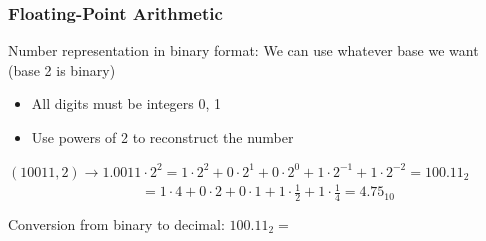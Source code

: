 \documentclass{beamer}
\begin{document}
\begin{frame}	
	\frametitle{Floating-Point Arithmetic}
	
	\begin{block}{Number representation in binary format:}
		We can use whatever base we want (base 2 is binary)
		
		\vspace{10pt}
		
		\begin{itemize}
			\item All digits must be integers 0, 1
			\item Use powers of 2 to reconstruct the number
		\end{itemize}
		
		\vspace{10pt}
		$(10011, 2) \rightarrow 1.0011\cdot2^{2} = 1\cdot2^2 + 0\cdot2^1+0\cdot2^0 + 1\cdot2^{-1} +1\cdot2^{-2} = 100.11_2$ \\
		$\hspace{114pt} = 1\cdot4 + 0\cdot2+0\cdot1 + 1\cdot\frac{1}{2} +1\cdot\frac{1}{4} = 4.75_{10}$
		
		\vspace{10pt}
		Conversion from binary to decimal: $100.11_2 = $
	\end{block}
	
\end{frame}
\end{document}
